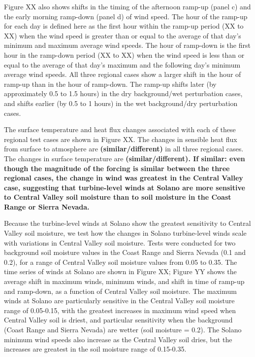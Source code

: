 \documentclass[12pt]{amsart}
\begin{document}
Figure XX also shows shifts in the timing of the afternoon ramp-up (panel c) and the early morning ramp-down (panel d) of wind speed.  The hour of the ramp-up for each day is defined here as the first hour within the ramp-up period (XX to XX) when the wind speed is greater than or equal to the average of that day's minimum and maximum average wind speeds.  The hour of ramp-down is the first hour in the ramp-down period (XX to XX) when the wind speed is less than or equal to the average of that day's maximum and the following day's minimum average wind speeds.  All three regional cases show a larger shift in the hour of ramp-up than in the hour of ramp-down.  The ramp-up shifts later (by approximately 0.5 to 1.5 hours) in the dry background/wet perturbation cases, and shifts earlier (by 0.5 to 1 hours) in the wet background/dry perturbation cases.

The surface temperature and heat flux changes associated with each of these regional test cases are shown in Figure XX.  The changes in sensible heat flux from surface to atmosphere are \textbf{(similar/different)} in all three regional cases.  The changes in surface temperature are \textbf{(similar/different).  If similar: even though the magnitude of the forcing is similar between the three regional cases, the change in wind was greatest in the Central Valley case, suggesting that turbine-level winds at  Solano are more sensitive to Central Valley soil moisture than to soil moisture in the Coast Range or Sierra Nevada.}

Because the turbine-level winds at Solano show the greatest sensitivity to Central Valley soil moisture, we test how the changes in Solano turbine-level winds scale with variations in Central Valley soil moisture.  Tests were conducted for two background soil moisture values in the Coast Range and Sierra Nevada (0.1 and 0.2), for a range of Central Valley soil moisture values from 0.05 to 0.35.  The time series of winds at Solano are shown in Figure XX; Figure YY shows the average shift in maximum winds, minimum winds, and shift in time of ramp-up and ramp-down, as a function of Central Valley soil moisture.  The maximum winds at Solano are particularly sensitive in the Central Valley soil moisture range of 0.05-0.15, with the greatest increases in maximum wind speed when Central Valley soil is driest, and particular sensitivity when the background (Coast Range and Sierra Nevada) are wetter (soil moisture = 0.2).  The Solano minimum wind speeds also increase as the Central Valley soil dries, but the increases are greatest in the soil moisture range of 0.15-0.35.
\end{document}
